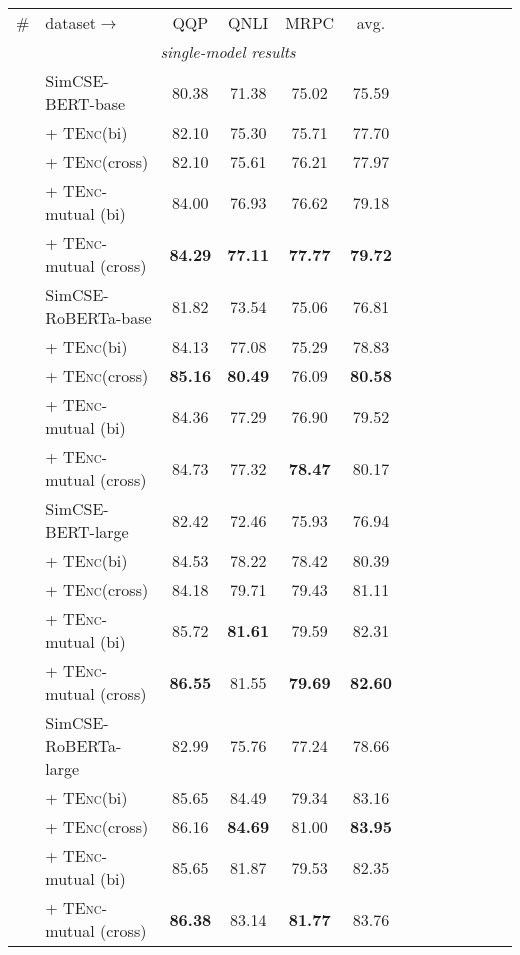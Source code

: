 \documentclass{article} \usepackage{iclr2021_conference,times}
\newcommand{\tenc}{\textsc{TEnc}\xspace}
\begin{document}
\begin{table}[!t] \setlength{\tabcolsep}{3.6pt}
\centering
\begin{tabular}{llccccccccccc}
\cmidrule[1.5pt]{1-10}
\# & dataset$\rightarrow$  & QQP & QNLI & MRPC & avg.\\
\cmidrule[1.5pt]{1-10}
\multicolumn{9}{c}{\textit{single-model results}} \\
\cmidrule[1.0pt]{1-10}
 & SimCSE-BERT-base & 80.38 & 71.38 & 75.02 & 75.59 \\
 & + \tenc (bi) & 82.10 & 75.30 & 75.71 & 77.70 \\
  & + \tenc (cross) & 82.10 & 75.61  & 76.21 & 77.97 \\
 \rowcolor{blue!5}
  & + \tenc-mutual (bi) &  84.00 & 76.93 & 76.62 & 79.18  \\
   \rowcolor{blue!5}
  & + \tenc-mutual (cross) & \textbf{84.29} & \textbf{77.11} & \textbf{77.77} & \textbf{79.72} \\
\hdashline
 & SimCSE-RoBERTa-base & 81.82 & 73.54 & 75.06 & 76.81  \\
 & + \tenc (bi) & 84.13 & 77.08 & 75.29 & 78.83  \\
  & + \tenc (cross) & \textbf{85.16} & \textbf{80.49} & 76.09 & \textbf{80.58}  \\
   \rowcolor{blue!5}
   & + \tenc-mutual (bi) & 84.36 & 77.29 & 76.90 & 79.52  \\
    \rowcolor{blue!5}
  & + \tenc-mutual (cross) & 84.73 & 77.32 & \textbf{78.47} & 80.17 \\
 \cmidrule[.5pt]{1-10}
 & SimCSE-BERT-large & 82.42 & 72.46 & 75.93 & 76.94 \\
  & + \tenc (bi) & 84.53 & 78.22 & 78.42 & 80.39 \\
  & + \tenc (cross) & 84.18 & 79.71 & 79.43 & 81.11 \\
  \rowcolor{red!5}
   & + \tenc-mutual (bi) & 85.72 & \textbf{81.61} & 79.59 & 82.31   \\
     \rowcolor{red!5} 
  & + \tenc-mutual (cross) & \textbf{86.55} & 81.55 & \textbf{79.69} & \textbf{82.60} \\
\hdashline
 & SimCSE-RoBERTa-large & 82.99 & 75.76 & 77.24 & 78.66 \\
   & + \tenc (bi) & 85.65 & 84.49 & 79.34 & 83.16 \\
  & + \tenc (cross) & 86.16 & \textbf{84.69} & 81.00 & \textbf{83.95} \\
    \rowcolor{red!5}
   & + \tenc-mutual (bi) &  85.65 & 81.87 & 79.53 & 82.35 \\
     \rowcolor{red!5}
  & + \tenc-mutual (cross) & \textbf{86.38} & 83.14 & \textbf{81.77} & 83.76 \\
  \cmidrule[1.5pt]{1-10}
  

\end{tabular}
\end{table}
\end{document}
